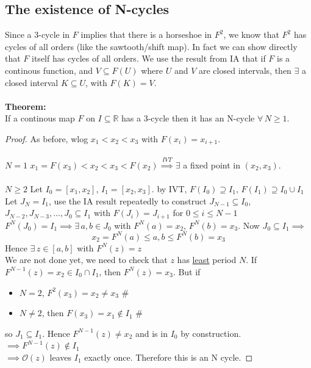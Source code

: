 \documentclass{article}
\newcommand{\cO}{\mathcal{O}}                               %
\newcommand{\theorem}{\textbf{Theorem:}}                    %
\begin{document}
\subsection{The existence of N-cycles}
Since a 3-cycle in $F$ implies that there is a horseshoe in $F^2$, we know that
$F^2$ has cycles of all orders (like the sawtooth/shift map). In fact we can
show directly that $F$ itself has cycles of all orders. We use the result from
IA that if $F$ is a continous function, and $V \subseteq F(U)$ where $U$ and 
$V$ are closed intervals, then $\exists$ a closed interval $K \subseteq U$,
with $F(K)=V$.
\\
\\
\theorem\ \\
If a continous map $F$ on $I \subseteq \mathbb{R}$ has a 3-cycle then it has
an N-cycle $\forall \, N \geq 1$.
\begin{proof}
As before, wlog $x_1<x_2< x_3$ with $F(x_i)=x_{i+1}$.
\\
\\
$\boxed{N=1}$ $x_1=F(x_3) < x_2 < x_3 < F(x_2) \overset{IVT}{\implies} \exists$
a fixed point in $(x_2,x_3)$.
\\
\\
$\boxed{N \geq 2}$ Let $I_0 = [x_1,x_2]$, $I_1=[x_2,x_3]$. by IVT, $F(I_0) 
\supseteq I_1$, $F(I_1) \supseteq I_0 \cup I_1 $
\\[2pt]
Let $J_N = I_1$, use the IA result repeatedly to construct 
$J_{N-1} \subseteq I_0$, $J_{N-2},J_{N-3}, \dots , J_0 \subseteq I_1$ with
$F(J_i) = J_{i+1}$ for $0 \leq i \leq N-1$
\\[2pt]
$F^{N}(J_0) = I_1 \implies \exists \, a,b\in J_0$ with $F^N(a)=x_2$, 
$F^N(b) =x_3$. Now $J_0 \subseteq I_1 \implies$
\[ x_2 = F^N(a) \leq a,b \leq F^N(b) =x_3 \]
Hence $\exists \, z \in [a,b]$ with $F^N(z)=z$
\\[2pt]
We are not done yet, we need to check that $z$ has \underline{least} period 
$N$. If $F^{N-1}(z)=x_2 \in I_0 \cap I_1$, then $F^N(z)=x_3$. But if 
\begin{itemize}
\item $N=2$, $F^2(x_3) = x_2 \neq x_3$ \# 
\item $N\neq2$, then $F(x_3)=x_1 \not\in I_1$ \#
\end{itemize}
%
so $J_1 \subseteq I_1$. Hence $F^{N-1}(z) \neq x_2$ and is in $I_0$ by construction. 
\\
$\implies F^{N-1}(z) \not \in I_1$ 
\\
$\implies \cO (z) $ leaves $I_1$ exactly once. Therefore this is an N cycle.
\end{proof}
\end{document}
